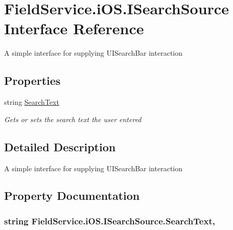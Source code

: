 \hypertarget{interface_field_service_1_1i_o_s_1_1_i_search_source}{\section{Field\+Service.\+i\+O\+S.\+I\+Search\+Source Interface Reference}
\label{interface_field_service_1_1i_o_s_1_1_i_search_source}
}


A simple interface for supplying U\+I\+Search\+Bar interaction  


\subsection*{Properties}
\begin{DoxyCompactItemize}
\item 
string \hyperlink{interface_field_service_1_1i_o_s_1_1_i_search_source_a2087d09332c44867b4d8c6e82a051967}{Search\+Text}
\begin{DoxyCompactList}\small\item\em Gets or sets the search text the user entered \end{DoxyCompactList}\end{DoxyCompactItemize}


\subsection{Detailed Description}
A simple interface for supplying U\+I\+Search\+Bar interaction 



\subsection{Property Documentation}
\hypertarget{interface_field_service_1_1i_o_s_1_1_i_search_source_a2087d09332c44867b4d8c6e82a051967}{
\subsubsection[{Search\+Text}]{\setlength{\rightskip}{0pt plus 5cm}string Field\+Service.\+i\+O\+S.\+I\+Search\+Source.\+Search\+Text\hspace{0.3cm}{\ttfamily [get]}, {\ttfamily [set]}}}\label{interface_field_service_1_1i_o_s_1_1_i_search_source_a2087d09332c44867b4d8c6e82a051967}


